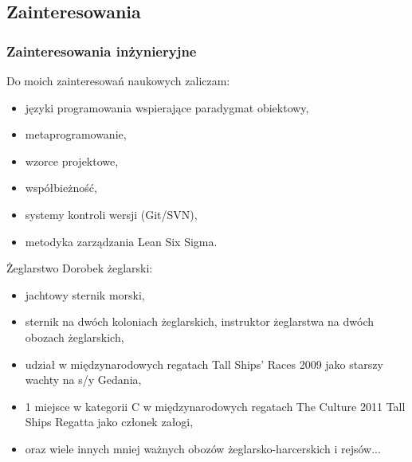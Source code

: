 \subsection{Zainteresowania}
\begin{frame}
  \frametitle{Zainteresowania inżynieryjne}
  
  Do moich zainteresowań naukowych zaliczam: \pause
  \begin{itemize}
  	\item języki programowania wspierające paradygmat obiektowy, \pause
  	\item metaprogramowanie,                                     \pause
  	\item wzorce projektowe,                                     \pause
  	\item współbieżność,                                         \pause
  	\item systemy kontroli wersji (Git/SVN),                     \pause
  	\item metodyka zarządzania Lean Six Sigma.
  \end{itemize}
\end{frame}

\begin{frame}{Żeglarstwo}
	Dorobek żeglarski:	
	\begin{itemize}
		\item jachtowy sternik morski,                                    \pause
		\item sternik na dwóch koloniach żeglarskich,
		  instruktor żeglarstwa na dwóch obozach żeglarskich,             \pause
		\item udział w międzynarodowych regatach Tall Ships' Races 2009
		  jako starszy wachty na s/y Gedania,                             \pause
		\item 1 miejsce w kategorii C w międzynarodowych regatach
		  The Culture 2011 Tall Ships Regatta jako członek załogi,        \pause
		\item oraz wiele innych mniej ważnych obozów żeglarsko-harcerskich i rejsów...          
	\end{itemize}
\end{frame}
	
